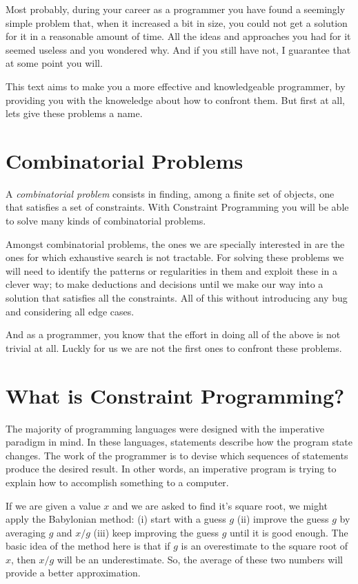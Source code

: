 Most probably, during your career as a programmer you have found
a seemingly simple problem that, when it increased a bit in size, you could not
get a solution for it in a reasonable amount of time. All the ideas and approaches
you had for it seemed useless and you wondered why.
And if you still have not, I guarantee that at some point you will.

This text aims to make you a more effective and knowledgeable programmer, by
providing you with the knoweledge about how to confront them. But first at all,
lets give these problems a name.

\section{Combinatorial Problems}

A \emph{combinatorial problem} consists in finding, among a finite set of
objects, one that satisfies a set of constraints. With Constraint Programming
you will be able to solve many kinds of combinatorial problems. 

Amongst combinatorial problems, the ones we are specially interested in are the
ones for which exhaustive search is not tractable. For solving these problems
we will need to identify the patterns or regularities in them and exploit these
in a clever way; to make deductions and decisions until we make our way into a
solution that satisfies all the constraints. All of this without introducing any
bug and considering all edge cases.

And as a programmer, you know that the effort in doing all of the above is not
trivial at all. Luckly for us we are not the first ones to confront these problems.

\section{What is Constraint Programming?}

The majority of programming languages were designed with the imperative
paradigm in mind. In these languages, statements describe how the program state
changes.  The work of the programmer is to devise which sequences of statements
produce the desired result. In other words, an imperative program is trying to
explain how to accomplish something to a computer.

\begin{example}
If we are given a value $x$ and we are asked to find it's square root, we might
apply the Babylonian method: (i) start with a guess $g$ (ii) improve the
guess $g$ by averaging $g$ and $x/g$ (iii) keep improving the guess $g$
until it is good enough.
%
The basic idea of the method here is that if $g$ is an overestimate to the
square root of $x$, then $x/g$ will be an underestimate. So, the average of
these two numbers will provide a better approximation.
\end{example}

